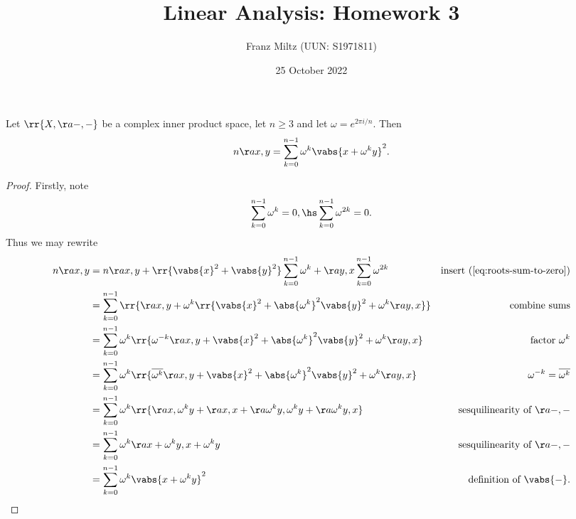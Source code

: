 \documentclass{article}
\begin{document}
\title{Linear Analysis: Homework 3}
\author{Franz Miltz (UUN: S1971811)}
\date{25 October 2022}

\maketitle

\begin{claim*}[2a]
  Let $\rr{X,\aa{-,-}}$ be a complex inner product space, let $n\geq 3$ and let
  $\omega=e^{2\pi i/n}$. Then
  \begin{align*}
    n\aa{x,y}=\sum_{k=0}^{n-1} \omega^k\vabs{x + \omega^ky}^2.
  \end{align*}
  \begin{proof}
    Firstly, note
    \begin{align}
      \label{eq:roots-sum-to-zero}
      \sum_{k=0}^{n-1} \omega^k = 0,\hs
      \sum_{k=0}^{n-1} \omega^{2k} = 0.
    \end{align}
    Thus we may rewrite
    \begin{align*}
      n\aa{x,y} &= n\aa{x,y} + \rr{\vabs{x}^2 + \vabs{y}^2} \sum_{k=0}^{n-1} \omega^k + \aa{y,x}\sum_{k=0}^{n-1} \omega^{2k} &\text{insert (\ref{eq:roots-sum-to-zero})}\\
                &= \sum_{k=0}^{n-1}\rr{\aa{x,y} + \omega^k \rr{\vabs{x}^2 + \abs{\omega^k}^2\vabs{y}^2 + \omega^k\aa{y,x}}} &\text{combine sums}\\
                & = \sum_{k=0}^{n-1}\omega^k \rr{\omega^{-k} \aa{x,y} + \vabs{x}^2 + \abs{\omega^k}^2\vabs{y}^2 + \omega^k\aa{y,x}} &\text{factor $\omega^k$}\\
                & = \sum_{k=0}^{n-1}\omega^k \rr{\overline{\omega^{k}} \aa{x,y} + \vabs{x}^2 + \abs{\omega^k}^2\vabs{y}^2 + \omega^k\aa{y,x}} &\text{$\omega^{-k}=\overline{\omega^k}$}\\
                & = \sum_{k=0}^{n-1}\omega^k \rr{\aa{x,\omega^k y}+\aa{x,x}+\aa{\omega^ky,\omega^ky}+\aa{\omega^k y, x}} &\text{sesquilinearity of $\aa{-,-}$}\\
                & = \sum_{k=0}^{n-1}\omega^k \aa{x+\omega^ky,x+\omega^ky} &\text{sesquilinearity of $\aa{-,-}$}\\
                & = \sum_{k=0}^{n-1} \omega^k \vabs{x+\omega^k y}^2 &\text{definition of $\vabs{-}$}.
    \end{align*}
  \end{proof}
\end{claim*}
\end{document}
